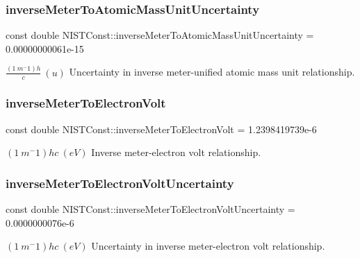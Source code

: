 \subsubsection{\texorpdfstring{inverse\+Meter\+To\+Atomic\+Mass\+Unit\+Uncertainty}{inverseMeterToAtomicMassUnitUncertainty}}
{\footnotesize\ttfamily const double N\+I\+S\+T\+Const\+::inverse\+Meter\+To\+Atomic\+Mass\+Unit\+Uncertainty = 0.\+00000000061e-\/15}

$\frac{(1\ m^-1)h}{c} \ (u)$ Uncertainty in inverse meter-\/unified atomic mass unit relationship. \mbox{\label{group___inverse_meter_gafdede27a7699d3a180bb829b65fac447}} 
\subsubsection{\texorpdfstring{inverse\+Meter\+To\+Electron\+Volt}{inverseMeterToElectronVolt}}
{\footnotesize\ttfamily const double N\+I\+S\+T\+Const\+::inverse\+Meter\+To\+Electron\+Volt = 1.\+2398419739e-\/6}

$(1\ m^-1)hc \ (eV)$ Inverse meter-\/electron volt relationship. \mbox{\label{group___inverse_meter_gaffb7462545a03fb13544c9f65d77dc7e}} 
\subsubsection{\texorpdfstring{inverse\+Meter\+To\+Electron\+Volt\+Uncertainty}{inverseMeterToElectronVoltUncertainty}}
{\footnotesize\ttfamily const double N\+I\+S\+T\+Const\+::inverse\+Meter\+To\+Electron\+Volt\+Uncertainty = 0.\+0000000076e-\/6}

$(1\ m^-1)hc \ (eV)$ Uncertainty in inverse meter-\/electron volt relationship. \mbox{\label{group___inverse_meter_ga6f47bdfe8997031b0f15229eb5bf4b9e}} 
